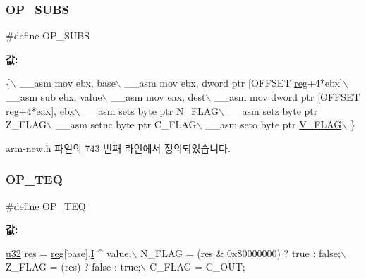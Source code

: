 \subsubsection{\texorpdfstring{O\+P\+\_\+\+S\+U\+BS}{OP\_SUBS}\hspace{0.1cm}{\footnotesize\ttfamily [2/2]}}
{\footnotesize\ttfamily \#define O\+P\+\_\+\+S\+U\+BS}

{\bfseries 값\+:}
\begin{DoxyCode}
\{\(\backslash\)
        \_\_asm mov ebx, base\(\backslash\)
        \_\_asm mov ebx, dword ptr [OFFSET \mbox{\hyperlink{_g_b_a_8h_ae29faba89509024ffd1a292badcedf2d}{reg}}+4*ebx]\(\backslash\)
        \_\_asm sub ebx, value\(\backslash\)
        \_\_asm mov eax, dest\(\backslash\)
        \_\_asm mov dword ptr [OFFSET \mbox{\hyperlink{_g_b_a_8h_ae29faba89509024ffd1a292badcedf2d}{reg}}+4*eax], ebx\(\backslash\)
        \_\_asm sets byte ptr N\_FLAG\(\backslash\)
        \_\_asm setz byte ptr Z\_FLAG\(\backslash\)
        \_\_asm setnc byte ptr C\_FLAG\(\backslash\)
        \_\_asm seto byte ptr \mbox{\hyperlink{_g_b_a_8h_a11a0e7b14a93be5eb2720b0151900919}{V\_FLAG}}\(\backslash\)
      \}
\end{DoxyCode}


arm-\/new.\+h 파일의 743 번째 라인에서 정의되었습니다.

\mbox{\label{_g_b_a_8cpp_a1e8149bc8733bf0d4b7a8c817b95a60e}} 
\subsubsection{\texorpdfstring{O\+P\+\_\+\+T\+EQ}{OP\_TEQ}\hspace{0.1cm}{\footnotesize\ttfamily [1/2]}}
{\footnotesize\ttfamily \#define O\+P\+\_\+\+T\+EQ}

{\bfseries 값\+:}
\begin{DoxyCode}
\mbox{\hyperlink{_system_8h_a10e94b422ef0c20dcdec20d31a1f5049}{u32}} res = \mbox{\hyperlink{_g_b_a_8h_ae29faba89509024ffd1a292badcedf2d}{reg}}[base].\mbox{\hyperlink{unionreg__pair_a9f6a42d56c07829d7013571eda998252}{I}} ^ value;\(\backslash\)
      N\_FLAG = (res & 0x80000000) ? \textcolor{keyword}{true} : \textcolor{keyword}{false};\(\backslash\)
      Z\_FLAG = (res) ? \textcolor{keyword}{false} : \textcolor{keyword}{true};\(\backslash\)
      C\_FLAG = C\_OUT;
\end{DoxyCode}
\mbox{\label{arm-new_8h_a1e8149bc8733bf0d4b7a8c817b95a60e}} 
